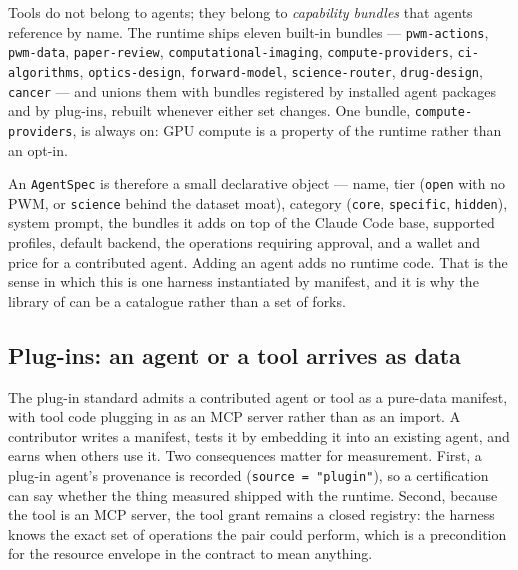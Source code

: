 \begin{sloppypar}
Tools do not belong to agents; they belong to \emph{capability bundles} that agents reference by name. The runtime ships eleven built-in bundles --- \texttt{pwm-\allowbreak actions}, \texttt{pwm-\allowbreak data}, \texttt{paper-\allowbreak review}, \texttt{computational-\allowbreak imaging}, \texttt{compute-\allowbreak providers}, \texttt{ci-\allowbreak algorithms}, \texttt{optics-\allowbreak design}, \texttt{forward-\allowbreak model}, \allowbreak \texttt{science-\allowbreak router}, \texttt{drug-\allowbreak design}, \texttt{cancer} --- and unions them with bundles registered by installed agent packages and by plug-ins, rebuilt whenever either set changes. One bundle, \texttt{compute-\allowbreak providers}, is always on: GPU compute is a property of the runtime rather than an opt-in.
\end{sloppypar}

An \texttt{AgentSpec} is therefore a small declarative object --- name, tier (\texttt{open} with no PWM, or \texttt{science} behind the dataset moat), category (\texttt{core}, \texttt{specific}, \texttt{hidden}), system prompt, the bundles it adds on top of the Claude Code base, supported profiles, default backend, the operations requiring approval, and a wallet and price for a contributed agent. Adding an agent adds no runtime code. That is the sense in which this is one harness instantiated by manifest, and it is why the library of \citet{yang2026library} can be a catalogue rather than a set of forks.

\subsection{Plug-ins: an agent or a tool arrives as data}

The plug-in standard admits a contributed agent or tool as a pure-data manifest, with tool code plugging in as an MCP server rather than as an import. A contributor writes a manifest, tests it by embedding it into an existing agent, and earns when others use it. Two consequences matter for measurement. First, a plug-in agent's provenance is recorded (\texttt{source = "plugin"}), so a certification can say whether the thing measured shipped with the runtime. Second, because the tool is an MCP server, the tool grant remains a closed registry: the harness knows the exact set of operations the pair could perform, which is a precondition for the resource envelope in the contract to mean anything.

